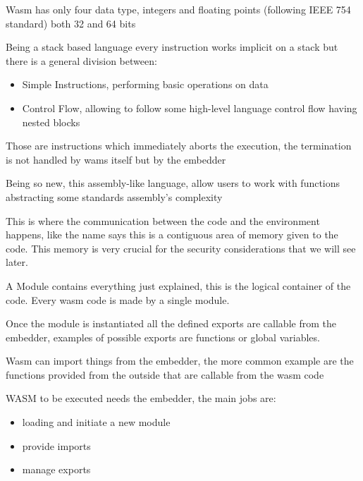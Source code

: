 \documentclass[../main.tex]{subfiles}
\begin{document}
\begin{description}[font=$\bullet$ \scshape\bfseries]
  \item[Values]
        Wasm has only four data type, integers and floating points (following IEEE 754 standard) both 32 and 64 bits
  \item[Instructions]
        Being a stack based language every instruction works implicit on a stack but there is a general division between:
        \begin{itemize}
          \item Simple Instructions, performing basic operations on data
          \item Control Flow, allowing to follow some high-level language control flow having nested blocks
        \end{itemize}
  \item[Traps]
        Those are instructions which immediately aborts the execution, the termination is not handled by wams itself but by the embedder
  \item[Functions]
        Being so new, this assembly-like language, allow users to work with functions abstracting some standards assembly's complexity
  \item[Linear Memory]
        This is where the communication between the code and the environment happens, like the name says this is a contiguous area of memory given to the code. This memory is very crucial for the security considerations that we will see later.
  \item[Modules]
        A Module contains everything just explained, this is the logical container of the code. Every wasm code is made by a single module.
  \item[Exports] Once the module is instantiated all the defined exports are callable from the embedder, examples of possible exports are functions or global variables.
  \item[Imports] Wasm can import things from the embedder, the more common example are the functions provided from the outside that are callable from the wasm code
  \item[Embedder]
        WASM to be executed needs the embedder, the main jobs are:
        \begin{itemize}
          \item loading and initiate a new module
          \item provide imports
          \item manage exports
        \end{itemize}
\end{description}
\end{document}
